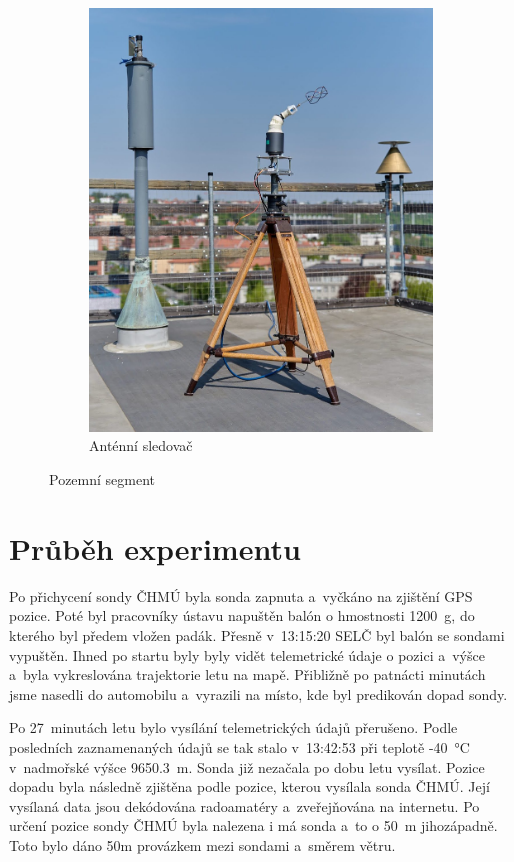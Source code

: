 \documentclass[twoside]{ctuthesis}
\theoremstyle{plain}
\theoremstyle{definition}
\theoremstyle{note}
\begin{document}
\begin{figure}[hbtp]
\begin{subfigure}{.49\textwidth}
			\includegraphics[height=1.2\textwidth]{Figures/tracker.jpg}
			\caption{Anténní sledovač}
			\label{fig:ground:tracker}
		\end{subfigure}
		\caption{Pozemní segment}
		\label{fig:ground}
	\end{figure}



	\section{Průběh experimentu}
	Po přichycení sondy ČHMÚ byla sonda zapnuta a~vyčkáno na zjištění GPS pozice. Poté byl pracovníky ústavu napuštěn balón o hmostnosti 1200~g, do kterého byl předem vložen padák. Přesně v~13:15:20 SELČ byl balón se sondami vypuštěn. Ihned po startu byly byly vidět telemetrické údaje o pozici a~výšce a~byla vykreslována trajektorie letu na mapě. Přibližně po patnácti minutách jsme nasedli do automobilu a~vyrazili na místo, kde byl predikován dopad sondy.

	Po 27~minutách letu bylo vysílání telemetrických údajů přerušeno. Podle posledních zaznamenaných údajů se tak stalo v~13:42:53 při teplotě -40~°C v~nadmořské výšce 9650.3~m. Sonda již nezačala po dobu letu vysílat. Pozice dopadu byla následně zjištěna podle pozice, kterou vysílala sonda ČHMÚ. Její vysílaná data jsou dekódována radoamatéry a~zveřejňována na internetu. Po určení pozice sondy ČHMÚ byla nalezena i má sonda a~to o 50~m jihozápadně. Toto bylo dáno 50m provázkem mezi sondami a~směrem větru.
\end{document}
